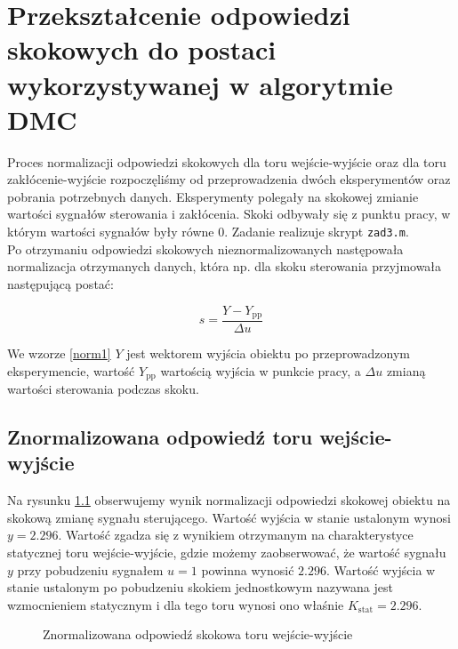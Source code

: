 \chapter{Przekształcenie odpowiedzi skokowych do postaci wykorzystywanej w algorytmie DMC}
\label{zad3}
Proces normalizacji odpowiedzi skokowych dla toru wejście-wyjście oraz dla toru zakłócenie-wyjście rozpoczęliśmy od przeprowadzenia dwóch eksperymentów oraz pobrania potrzebnych danych. Eksperymenty polegały na skokowej zmianie wartości sygnałów sterowania i zakłócenia. Skoki odbywały się z punktu pracy, w którym wartości sygnałów były równe 0. Zadanie realizuje skrypt \verb+zad3.m+.\\
\indent{} Po otrzymaniu odpowiedzi skokowych nieznormalizowanych następowała normalizacja otrzymanych danych, która np. dla skoku sterowania przyjmowała następującą postać:

\begin{equation}
\label{norm1}
s = \frac{Y - Y_{\mathrm{pp}}}{\Delta u}
\end{equation}

We wzorze \ref{norm1} $Y$ jest wektorem wyjścia obiektu po przeprowadzonym eksperymencie, wartość $Y_{\mathrm{pp}}$ wartością wyjścia w punkcie pracy, a $\Delta u$ zmianą wartości sterowania podczas skoku.

\section{Znormalizowana odpowiedź toru wejście-wyjście}
Na rysunku \ref{zad3_norm_odp_u} obserwujemy wynik normalizacji odpowiedzi skokowej obiektu na skokową zmianę sygnału sterującego. 
Wartość wyjścia w stanie ustalonym wynosi $y = \num{2,296}$. Wartość zgadza się z wynikiem otrzymanym na charakterystyce 
statycznej toru wejście-wyjście, gdzie możemy zaobserwować, że wartość sygnału $y$ przy pobudzeniu sygnałem $u = 1$ powinna wynosić $\num{2,296}$.
Wartość wyjścia w stanie ustalonym po pobudzeniu skokiem jednostkowym nazywana jest wzmocnieniem statycznym i dla tego toru wynosi ono właśnie 
$K_{\mathrm{stat}} = \num{2,296}$.  

\begin{figure}[t]
    \centering
    \caption{Znormalizowana odpowiedź skokowa toru wejście-wyjście}
    \label{zad3_norm_odp_u}
\end{figure}


